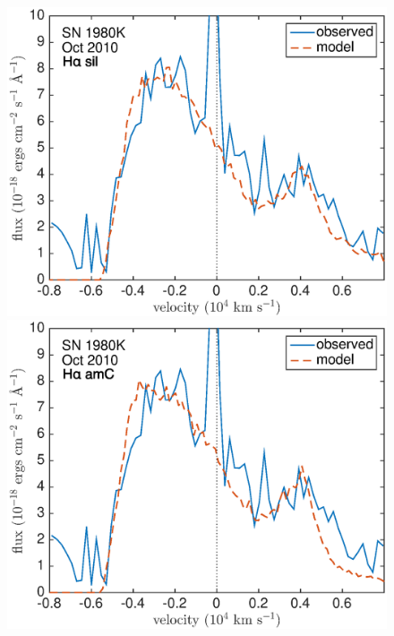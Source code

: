 {\begin{landscape}
\end{landscape}
\begin{figure}[!t]
\centering
\includegraphics[scale=0.4,clip=true, trim=20 0 40 20]{chapters/chapter6/figs/80K/smooth/Ha}
\includegraphics[scale=0.4,clip=true, trim=20 0 40 20]{chapters/chapter6/figs/80K/smooth/Ha_amC}


\end{figure}}
